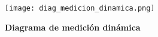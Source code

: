\begin{figure}
     \centering
     \texttt{[image: diag\_medicion\_dinamica.png]}
     \caption{\textbf{Diagrama de medición dinámica}}
     \label{fig:diag_medicion_dinamica}
\end{figure}


%
%
%
%
%
%
%
%
%
%
%

